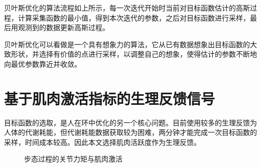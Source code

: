 贝叶斯优化的算法流程如上所示，每一次迭代开始时当前对目标函数估计的高斯过程，计算采集函数的最小值，得到本次迭代的参数，之后对目标函数进行采样，最后用观测到的数据更新高斯过程。

贝叶斯优化可以看做是一个具有想象力的算法，它从已有数据想象出目标函数的大致形状，并选择有价值的点进行采样，以调整自己的想象，使得估计的参数不断地向最优参数靠近并收敛。

\section{基于肌肉激活指标的生理反馈信号}

目标函数的选取，是人在环中优化的另一个核心问题。目前使用较多的生理反馈为人体的代谢耗能，但代谢耗能数据获取较为困难，两分钟才能完成一次目标函数的采样，时间成本较高。因此本文选择肌肉活跃度作为生理反馈。
\begin{figure}[htb]
    \caption{步态过程的关节力矩与肌肉激活\cite{p44}}
    \label{fig:subfigss}
\end{figure}

